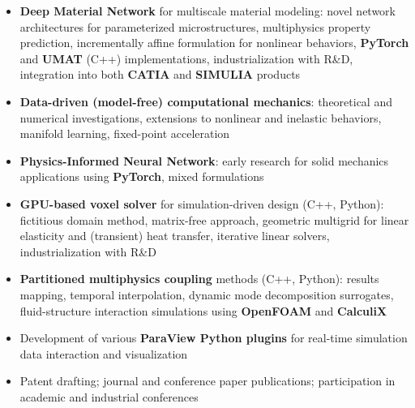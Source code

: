 \documentclass[10pt,a4paper,ragged2e,withhyper]{altacv}
\begin{document}
\begin{paracol}{2}

  \begin{itemize}
    \item \textbf{Deep Material Network} for multiscale material modeling: novel network architectures for parameterized microstructures, multiphysics property prediction, incrementally affine formulation for nonlinear behaviors, \textbf{PyTorch} and \textbf{UMAT} (C++) implementations, industrialization with R\&D, integration into both \textbf{CATIA} and \textbf{SIMULIA} products
    \item \textbf{Data-driven (model-free) computational mechanics}: theoretical and numerical investigations, extensions to nonlinear and inelastic behaviors, manifold learning, fixed-point acceleration
    \item \textbf{Physics-Informed Neural Network}: early research for solid mechanics applications using \textbf{PyTorch}, mixed formulations
    \item \textbf{GPU-based voxel solver} for simulation-driven design (C++, Python): fictitious domain method, matrix-free approach, geometric multigrid for linear elasticity and (transient) heat transfer, iterative linear solvers, industrialization with R\&D
    \item \textbf{Partitioned multiphysics coupling} methods (C++, Python): results mapping, temporal interpolation, dynamic mode decomposition surrogates, fluid-structure interaction simulations using \textbf{OpenFOAM} and \textbf{CalculiX}
    \item Development of various \textbf{ParaView Python plugins} for real-time simulation data interaction and visualization
    \item Patent drafting; journal and conference paper publications; participation in academic and industrial conferences
  \end{itemize}

  \divider


\end{paracol}
\end{document}
